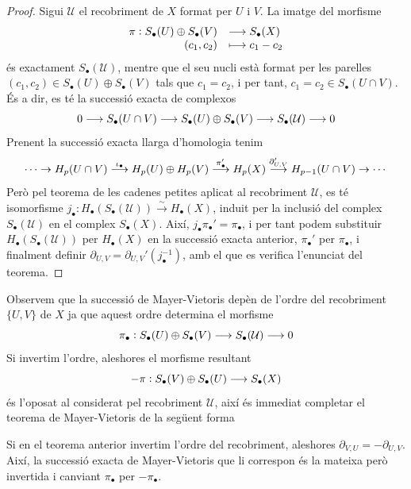 \documentclass[../main.tex]{subfiles}
\begin{document}
\begin{proof}
Sigui $\mathcal{U}$ el recobriment de $X$ format per $U$ i $V$. La imatge del morfisme
\begin{equation}
    \notag
    \begin{array}{rl}
        \pi:S_\bullet(U)\oplus S_\bullet(V) & \longrightarrow S_\bullet(X) \\
        (c_1,c_2) & \longmapsto c_1-c_2
    \end{array}
\end{equation}
és exactament $S_\bullet(\mathcal{U})$, mentre que el seu nucli està format per les parelles $(c_1,c_2)\in S_\bullet(U)\oplus S_\bullet(V)$ tals que $c_1 = c_2$, i per tant, $c_1 = c_2\in S_\bullet(U\cap V)$. És a dir, es té la successió exacta de complexos
\begin{equation}
    \notag
    0\longrightarrow S_\bullet(U\cap V)\longrightarrow S_\bullet(U)\oplus S_\bullet(V)\longrightarrow S_\bullet(\mathcal{U})\longrightarrow 0
\end{equation}
Prenent la successió exacta llarga d'homologia tenim
\begin{equation}
    \notag
    \cdots \rightarrow H_p(U\cap V)\overset{\iota_\bullet}{\longrightarrow}H_p(U)\oplus H_p(V)\overset{\pi_\bullet'}{\longrightarrow} H_p(X)\overset{\partial_{U,V}'}{\longrightarrow}H_{p-1}(U\cap V)\rightarrow\cdots
\end{equation}
Però pel teorema de les cadenes petites aplicat al recobriment $\mathcal{U}$, es té isomorfisme $j_\bullet:H_\bullet(S_\bullet(\mathcal{U}))\overset{\sim}{\longrightarrow}H_\bullet(X)$, induit per la inclusió del complex $S_\bullet(\mathcal{U})$ en el complex $S_\bullet(X)$. Així, $j_\bullet\pi_\bullet' = \pi_\bullet$, i per tant podem substituir $H_\bullet(S_\bullet(\mathcal{U}))$ per $H_\bullet(X)$ en la successió exacta anterior, $\pi_\bullet'$ per $\pi_\bullet$, i finalment definir $\partial_{U,V} = \partial_{U,V}'(j_\bullet^{-1})$, amb el que es verifica l'enunciat del teorema.
\end{proof}

Observem que la successió de Mayer-Vietoris depèn de l'ordre del recobriment $\{U,V\}$ de $X$ ja que aquest ordre determina el morfisme
\begin{equation}
    \notag
    \pi_\bullet:S_\bullet(U)\oplus S_\bullet(V)\longrightarrow S_\bullet(\mathcal{U})\longrightarrow 0
\end{equation}
Si invertim l'ordre, aleshores el morfisme resultant
\begin{equation}
    \notag
    -\pi:S_\bullet(V)\oplus S_\bullet(U)\longrightarrow S_\bullet(X)
\end{equation}
és l'oposat al considerat pel recobriment $\mathcal{U}$, així és immediat completar el teorema de Mayer-Vietoris de la següent forma
\begin{coro}
Si en el teorema anterior invertim l'ordre del recobriment, aleshores $\partial_{V,U} = -\partial_{U,V}$. Així, la successió exacta de Mayer-Vietoris que li correspon és la mateixa però invertida i canviant $\pi_\bullet$ per $-\pi_\bullet$.
\end{coro}
\end{document}
